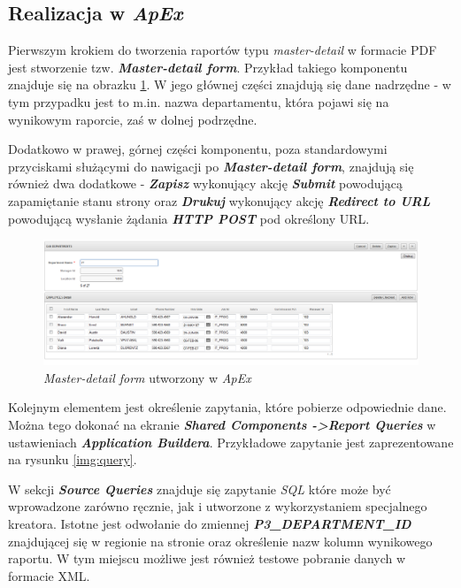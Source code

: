\documentclass[11pt,a4paper]{article}
\begin{document}
\subsection{Realizacja w \emph{ApEx}} \label{test:apex}
Pierwszym krokiem do tworzenia raportów typu \emph{master-detail} w formacie PDF jest stworzenie tzw. \textbf{\emph{Master-detail form}}. Przykład takiego komponentu znajduje się na obrazku \ref{img:master-detail-form}. W jego głównej części znajdują się dane nadrzędne - w tym przypadku jest to m.in. nazwa departamentu, która pojawi się na wynikowym raporcie, zaś w dolnej podrzędne. 

Dodatkowo w prawej, górnej części komponentu, poza standardowymi przyciskami służącymi do nawigacji po \textbf{\emph{Master-detail form}}, znajdują się również dwa dodatkowe - \textbf{\emph{Zapisz}} wykonujący akcję \textbf{\emph{Submit}} powodującą zapamiętanie stanu strony oraz \textbf{\emph{Drukuj}} wykonujący akcję \textbf{\emph{Redirect to URL}} powodującą wysłanie żądania \textbf{\emph{HTTP POST}} pod określony URL.

\begin{figure}[h]
\centering
\includegraphics[scale=0.4]{master-detail-form}
\caption{\emph{Master-detail form} utworzony w \emph{ApEx}}
\label{img:master-detail-form}
\end{figure}

Kolejnym elementem jest określenie zapytania, które pobierze odpowiednie dane. Można tego dokonać na ekranie \textbf{\emph{Shared Components -\textgreater Report Queries}} w ustawieniach \textbf{\emph{Application Buildera}}. Przykładowe zapytanie jest zaprezentowane na rysunku \ref{img:query}. 

W sekcji \textbf{\emph{Source Queries}} znajduje się zapytanie \emph{SQL} które może być wprowadzone zarówno ręcznie, jak i utworzone z wykorzystaniem specjalnego kreatora. Istotne jest odwołanie do zmiennej \textbf{\emph{P3\_DEPARTMENT\_ID}} znajdującej się w regionie na stronie oraz określenie nazw kolumn wynikowego raportu. W tym miejscu możliwe jest również testowe pobranie danych w formacie XML.
\end{document}
